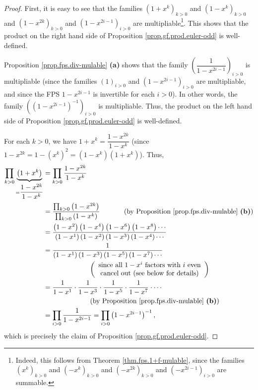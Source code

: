 \begin{proof}
First, it is easy to see that the families $\left(  1+x^{k}\right)  _{k>0}$
and $\left(  1-x^{k}\right)  _{k>0}$ and $\left(  1-x^{2k}\right)  _{k>0}$ and
$\left(  1-x^{2i-1}\right)  _{i>0}$ are multipliable\footnote{Indeed, this
follows from Theorem \ref{thm.fps.1+f-mulable}, since the families $\left(
x^{k}\right)  _{k>0}$ and $\left(  -x^{k}\right)  _{k>0}$ and $\left(
-x^{2k}\right)  _{k>0}$ and $\left(  -x^{2i-1}\right)  _{i>0}$ are summable.}.
This shows that the product on the right hand side of Proposition
\ref{prop.gf.prod.euler-odd} is well-defined.

Proposition \ref{prop.fps.div-mulable} \textbf{(a)} shows that the family
$\left(  \dfrac{1}{1-x^{2i-1}}\right)  _{i>0}$ is multipliable (since the
families $\left(  1\right)  _{i>0}$ and $\left(  1-x^{2i-1}\right)  _{i>0}$
are multipliable, and since the FPS $1-x^{2i-1}$ is invertible for each
$i>0$). In other words, the family $\left(  \left(  1-x^{2i-1}\right)
^{-1}\right)  _{i>0}$ is multipliable. Thus, the product on the left hand side
of Proposition \ref{prop.gf.prod.euler-odd} is well-defined.

For each $k>0$, we have $1+x^{k}=\dfrac{1-x^{2k}}{1-x^{k}}$ (since
$1-x^{2k}=1-\left(  x^{k}\right)  ^{2}=\left(  1-x^{k}\right)  \left(
1+x^{k}\right)  $). Thus,%
\begin{align*}
\prod_{k>0}\underbrace{\left(  1+x^{k}\right)  }_{=\dfrac{1-x^{2k}}{1-x^{k}}}
&  =\prod_{k>0}\dfrac{1-x^{2k}}{1-x^{k}}\\
&  =\dfrac{\prod_{k>0}\left(  1-x^{2k}\right)  }{\prod_{k>0}\left(
1-x^{k}\right)  }\ \ \ \ \ \ \ \ \ \ \left(  \text{by Proposition
\ref{prop.fps.div-mulable} \textbf{(b)}}\right) \\
&  =\dfrac{\left(  1-x^{2}\right)  \left(  1-x^{4}\right)  \left(
1-x^{6}\right)  \left(  1-x^{8}\right)  \cdots}{\left(  1-x^{1}\right)
\left(  1-x^{2}\right)  \left(  1-x^{3}\right)  \left(  1-x^{4}\right)
\cdots}\\
&  =\dfrac{1}{\left(  1-x^{1}\right)  \left(  1-x^{3}\right)  \left(
1-x^{5}\right)  \left(  1-x^{7}\right)  \cdots}\\
&  \ \ \ \ \ \ \ \ \ \ \ \ \ \ \ \ \ \ \ \ \left(
\begin{array}
[c]{c}%
\text{since all }1-x^{i}\text{ factors with }i\text{ even}\\
\text{cancel out (see below for details)}%
\end{array}
\right) \\
&  =\dfrac{1}{1-x^{1}}\cdot\dfrac{1}{1-x^{3}}\cdot\dfrac{1}{1-x^{5}}%
\cdot\dfrac{1}{1-x^{7}}\cdot\cdots\\
&  \ \ \ \ \ \ \ \ \ \ \ \ \ \ \ \ \ \ \ \ \left(  \text{by Proposition
\ref{prop.fps.div-mulable} \textbf{(b)}}\right) \\
&  =\prod_{i>0}\dfrac{1}{1-x^{2i-1}}=\prod_{i>0}\left(  1-x^{2i-1}\right)
^{-1},
\end{align*}
which is precisely the claim of Proposition \ref{prop.gf.prod.euler-odd}.


\end{proof}
